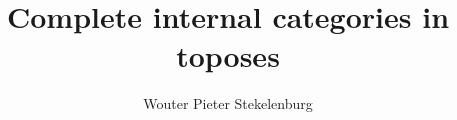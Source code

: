 \documentclass{tac}
\title{Complete internal categories in toposes}
\author{Wouter Pieter Stekelenburg}\copyrightyear{2015}
\newcommand\hide[1]{}
\begin{document}
\maketitle

\hide{
-goal
strong completeness of modest sets in asm_ex/lex

-background
complete small categories are posets
complete internal categories in Grothendieck toposes are posets too

-strong and weak completeness

Not complete in every slice, only a dense subcategory where things are complete

-preservation of strong completeness by the ex/lex completion

}
\end{document}
